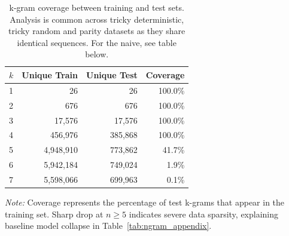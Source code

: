 \documentclass{article}
\theoremstyle{plain}
\theoremstyle{definition}
\theoremstyle{remark}
\begin{document}
\begin{table}[h]
\centering
\caption{k-gram coverage between training and test sets. Analysis is common across tricky deterministic, tricky random and parity  datasets as they share identical sequences. For the naive, see table below.}
\label{tab:ngram_coverage}
\small
\begin{tabular}{lrrr}
\toprule
$k$ & Unique Train & Unique Test & Coverage \\
\midrule
1 & 26 & 26 & 100.0\%\\
2 & 676 & 676 & 100.0\% \\
3 & 17,576 & 17,576 & 100.0\% \\
4 & 456,976 & 385,868 & 100.0\%  \\
5 & 4,948,910 & 773,862 & 41.7\% \\
6 & 5,942,184 & 749,024 & 1.9\%  \\
7 & 5,598,066 & 699,963 & 0.1\%  \\
\bottomrule
\end{tabular}
\vspace{0.1cm}

\footnotesize
\textit{Note:} Coverage represents the percentage of test k-grams that appear in the training set. Sharp drop at $n \geq 5$ indicates severe data sparsity, explaining baseline model collapse in Table~\ref{tab:ngram_appendix}.
\end{table}
\end{document}
